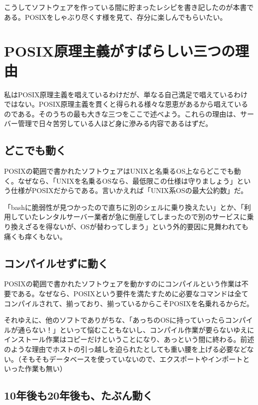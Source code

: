 こうしてソフトウェアを作っている間に貯まったレシピを書き記したのが本書である。POSIXをしゃぶり尽くす様を見て、存分に楽しんでもらいたい。

\section*{POSIX原理主義がすばらしい三つの理由}

私はPOSIX原理主義を唱えているわけだが、単なる自己満足で唱えているわけではない。POSIX原理主義を貫くと得られる様々な恩恵があるから唱えているのである。そのうちの最も大きな三つをここで述べよう。これらの理由は、サーバー管理で日々苦労している人ほど身に滲みる内容であるはずだ。

\subsection*{どこでも動く}

POSIXの範囲で書かれたソフトウェアはUNIXと名乗るOS上ならどこでも動く。なぜなら、「UNIXを名乗るOSなら、最低限この仕様は守りましょう」という仕様がPOSIXだからである。言いかえれば「UNIX系OSの最大公約数」だ。

「bashに脆弱性が見つかったので直ちに別のシェルに乗り換えたい」とか、「利用していたレンタルサーバー業者が急に倒産してしまったので別のサービスに乗り換えざるを得ないが、OSが替わってしまう」という外的要因に見舞われても痛くも痒くもない。

\subsection*{コンパイルせずに動く}

POSIXの範囲で書かれたソフトウェアを動かすのにコンパイルという作業は不要である。なぜなら、POSIXという要件を満たすために必要なコマンドは全てコンパイルされて、揃っており、揃っているからこそPOSIXを名乗れるからだ。

それゆえに、他のソフトでありがちな、「あっちのOSに持っていったらコンパイルが通らない！」といって悩むこともないし、コンパイル作業が要らないゆえにインストール作業はコピーだけということになり、あっという間に終わる。前述のような理由でホストの引っ越しを迫られたとしても重い腰を上げる必要などない。（そもそもデータベースを使っていないので、エクスポートやインポートといった作業も無い）

\subsection*{10年後も20年後も、たぶん動く}

